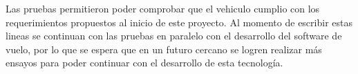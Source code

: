 Las pruebas permitieron poder comprobar que el vehiculo cumplio con los requerimientos propuestos al inicio de este proyecto. Al momento de escribir estas lineas se continuan con las pruebas en paralelo con el desarrollo del software de vuelo, por lo que se espera que en un futuro cercano se logren realizar más ensayos para poder continuar con el desarrollo de esta tecnología.
